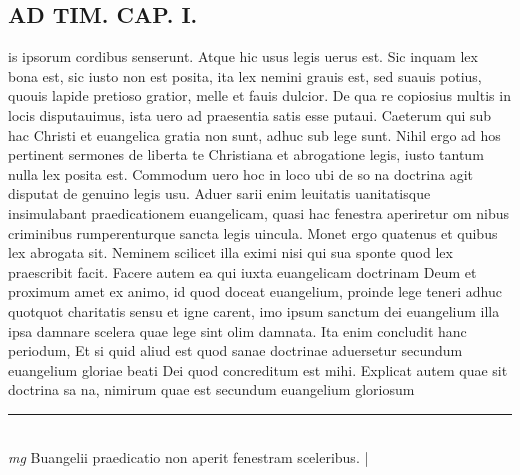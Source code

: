 \documentclass{article}
\begin{document}
\begin{pages}
\section*{AD TIM. CAP. I. }
\marginpar{[ p.101 ]}\pstart is ipsorum cordibus senserunt. Atque hic usus legis uerus est. Sic inquam lex bona est, sic iusto non est posita, ita lex nemini grauis est, sed suauis potius, quouis lapide pretioso gratior, melle et fauis dulcior. De qua re copiosius multis in locis disputauimus, ista uero ad praesentia satis esse putaui. Caeterum qui sub hac Christi et euangelica gratia non sunt, adhuc sub lege sunt. Nihil ergo ad hos pertinent sermones de liberta te Christiana et abrogatione legis, iusto tantum nulla lex posita est. Commodum uero hoc in loco ubi de so na doctrina agit disputat de genuino legis usu. Aduer sarii enim leuitatis uanitatisque insimulabant praedicationem euangelicam, quasi hac fenestra aperiretur om nibus criminibus rumperenturque sancta legis uincula. Monet ergo quatenus et quibus lex abrogata sit. Neminem scilicet illa eximi nisi qui sua sponte quod lex praescribit facit. Facere autem ea qui iuxta euangelicam doctrinam Deum et proximum amet ex animo, id quod doceat euangelium, proinde lege teneri adhuc quotquot charitatis sensu et igne carent, imo ipsum sanctum dei euangelium illa ipsa damnare scelera quae lege sint olim damnata. Ita enim concludit hanc periodum, Et si quid aliud est quod sanae doctrinae aduersetur secundum euangelium gloriae beati Dei quod concreditum est mihi. Explicat autem quae sit doctrina sa na, nimirum quae est secundum euangelium gloriosum  \pend
\vspace{0.5cm}\noindent
\vspace{0.2cm}\rule{1cm}{0.2pt}\\ 
\hspace{0.2cm}\textit{mg}
\footnotesize Buangelii praedicatio non aperit fenestram sceleribus. 
\normalsize| 

\end{pages}
\end{document}
